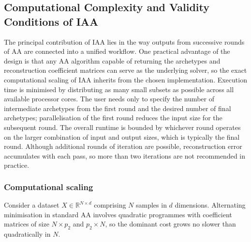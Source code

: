 \documentclass{WileyMSP-template}
\begin{document}
\subsection{Computational Complexity and Validity Conditions of IAA}

The principal contribution of IAA lies in the way outputs from successive rounds of AA are connected into a unified workflow. One practical advantage of the design is that any AA algorithm capable of returning the archetypes and reconstruction coefficient matrices can serve as the underlying solver, so the exact computational scaling of IAA inherits from the chosen implementation. Execution time is minimised by distributing as many small subsets as possible across all available processor cores. The user needs only to specify the number of intermediate archetypes from the first round and the desired number of final archetypes; parallelisation of the first round reduces the input size for the subsequent round. The overall runtime is bounded by whichever round operates on the larger combination of input and output sizes, which is typically the final round. Although additional rounds of iteration are possible, reconstruction error accumulates with each pass, so more than two iterations are not recommended in practice.

\subsubsection{Computational scaling}
Consider a dataset $X \in \mathbb{R}^{N \times d}$ comprising $N$ samples in $d$ dimensions. Alternating minimisation in standard AA involves quadratic programmes with coefficient matrices of size $N \times p_2$ and $p_2 \times N$, so the dominant cost grows no slower than quadratically in $N$.
\end{document}
